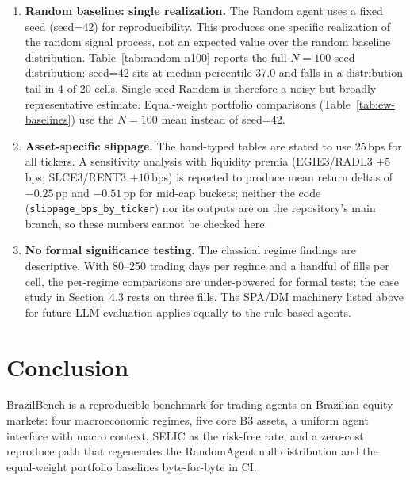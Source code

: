 \documentclass{article}
\begin{document}
\begin{enumerate}
\item \textbf{Random baseline: single realization.} The Random agent
uses a fixed seed (seed=42) for reproducibility. This produces one
specific realization of the random signal process, not an expected
value over the random baseline distribution. Table~\ref{tab:random-n100}
reports the full $N{=}100$-seed distribution: seed=42 sits at median
percentile 37.0 and falls in a distribution tail in 4 of 20 cells.
Single-seed Random is therefore a noisy but broadly representative
estimate. Equal-weight portfolio comparisons (Table~\ref{tab:ew-baselines})
use the $N{=}100$ mean instead of seed=42.

\item \textbf{Asset-specific slippage.} The hand-typed tables are stated
to use 25\,bps for all tickers. A sensitivity analysis with liquidity premia
(EGIE3/RADL3 $+5$\,bps; SLCE3/RENT3 $+10$\,bps) is reported to produce mean
return deltas of $-0.25$\,pp and $-0.51$\,pp for mid-cap buckets; neither
the code (\texttt{slippage\_bps\_by\_ticker}) nor its outputs are on the
repository's main branch, so these numbers cannot be checked here.

\item \textbf{No formal significance testing.} The classical regime
findings are descriptive. With 80--250 trading days per regime and a
handful of fills per cell, the per-regime comparisons are
under-powered for formal tests; the case study in Section~4.3 rests
on three fills. The SPA/DM machinery listed above for future LLM
evaluation applies equally to the rule-based agents.

\end{enumerate}

\section{Conclusion}

BrazilBench is a reproducible benchmark for trading agents on
Brazilian equity markets: four macroeconomic regimes, five core B3
assets, a uniform agent interface with macro context, SELIC as the
risk-free rate, and a zero-cost reproduce path that regenerates the
RandomAgent null distribution and the equal-weight portfolio
baselines byte-for-byte in CI.
\end{document}
